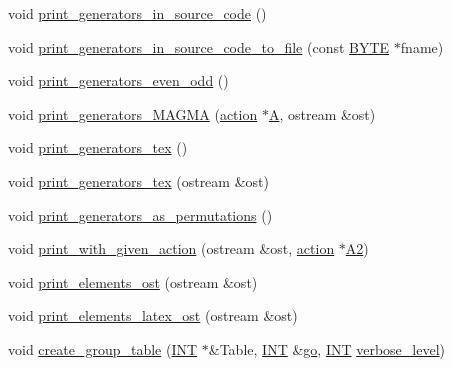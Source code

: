 \begin{DoxyCompactItemize}
\item 
void \mbox{\hyperlink{classstrong__generators_abacd0b02d1f3595d3357ac942c1148a5}{print\+\_\+generators\+\_\+in\+\_\+source\+\_\+code}} ()
\item 
void \mbox{\hyperlink{classstrong__generators_a7e9e23f8407f28f208a32d1b1d031f57}{print\+\_\+generators\+\_\+in\+\_\+source\+\_\+code\+\_\+to\+\_\+file}} (const \mbox{\hyperlink{galois_8h_ab6cc7b4aeb6ea31aba2b3fbfc83ff5e6}{B\+Y\+TE}} $\ast$fname)
\item 
void \mbox{\hyperlink{classstrong__generators_a377bd16671ec85f61cfacd46500db60a}{print\+\_\+generators\+\_\+even\+\_\+odd}} ()
\item 
void \mbox{\hyperlink{classstrong__generators_aa0adfb61a4fcb1b219f5be44a42ef141}{print\+\_\+generators\+\_\+\+M\+A\+G\+MA}} (\mbox{\hyperlink{classaction}{action}} $\ast$\mbox{\hyperlink{classstrong__generators_af0347a92942f8996e71d97b9a8df5069}{A}}, ostream \&ost)
\item 
void \mbox{\hyperlink{classstrong__generators_a5ec5e1048119097985c01a56f427d873}{print\+\_\+generators\+\_\+tex}} ()
\item 
void \mbox{\hyperlink{classstrong__generators_ae4d81315ba881e7adb846b079fa9f0d8}{print\+\_\+generators\+\_\+tex}} (ostream \&ost)
\item 
void \mbox{\hyperlink{classstrong__generators_ab08a961b1e23ea15b4a28f1d3102dab0}{print\+\_\+generators\+\_\+as\+\_\+permutations}} ()
\item 
void \mbox{\hyperlink{classstrong__generators_a6f470676cb12740c515471ed98e7f0de}{print\+\_\+with\+\_\+given\+\_\+action}} (ostream \&ost, \mbox{\hyperlink{classaction}{action}} $\ast$\mbox{\hyperlink{simeon_8_c_a13fda35b8976a20080ec22b9d9e44e5b}{A2}})
\item 
void \mbox{\hyperlink{classstrong__generators_a592bfe2b3b7acdca7afa13f0777bef37}{print\+\_\+elements\+\_\+ost}} (ostream \&ost)
\item 
void \mbox{\hyperlink{classstrong__generators_ac0c6cadbf23c3fc63d002975a8d13cef}{print\+\_\+elements\+\_\+latex\+\_\+ost}} (ostream \&ost)
\item 
void \mbox{\hyperlink{classstrong__generators_a71a070c14d4a951cbf7de836e5d8d1be}{create\+\_\+group\+\_\+table}} (\mbox{\hyperlink{galois_8h_a09fddde158a3a20bd2dcadb609de11dc}{I\+NT}} $\ast$\&Table, \mbox{\hyperlink{galois_8h_a09fddde158a3a20bd2dcadb609de11dc}{I\+NT}} \&\mbox{\hyperlink{simeon_8_c_a1516b736c8ebbfb03a9dd7d8826cd9a6}{go}}, \mbox{\hyperlink{galois_8h_a09fddde158a3a20bd2dcadb609de11dc}{I\+NT}} \mbox{\hyperlink{simeon_8_c_a818073fbcc2f439e7c56952f67386122}{verbose\+\_\+level}})

\end{DoxyCompactItemize}
